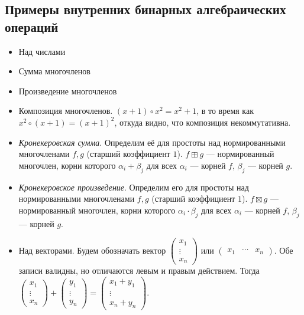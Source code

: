 \documentclass[a4paper]{report}
\begin{document}
    \subsection{Примеры внутренних бинарных алгебраических операций}
    \label{binary_operations}
    \begin{itemize}
        \item Над числами
        \item Сумма многочленов
        \item Произведение многочленов
        \item Композиция многочленов.
        $(x + 1) \circ x^2 = x^2 + 1$, в то время как $x^2 \circ (x + 1) = (x + 1)^2$, откуда видно, что композиция некоммутативна.
        \item \emph{Кронекеровская сумма}.
        Определим её для простоты над нормированными многочленами $f, g$ (старший коэффициент $1$).
        $f \boxplus  g$ --- нормированный многочлен, корни которого $\alpha_i + \beta_j$ для всех $\alpha_i$ --- корней $f$, $\beta_j$ --- корней $g$.

        \item \emph{Кронекеровское произведение}.
        Определим его для простоты над нормированными многочленами $f, g$ (старший коэффициент $1$).
        $f \boxtimes  g$ --- нормированный многочлен, корни которого $\alpha_i \cdot \beta_j$ для всех $\alpha_i$ --- корней $f$, $\beta_j$ --- корней $g$.

        \item Над векторами.
        Будем обозначать вектор $\begin{pmatrix}
                                     x_1\\ \vdots \\ x_n
        \end{pmatrix}$ или $\begin{pmatrix}
                                x_1& \cdots & x_n
        \end{pmatrix}$.
        Обе записи валидны, но отличаются левым и правым действием.
        Тогда $\begin{pmatrix}
                   x_1\\ \vdots \\ x_n
        \end{pmatrix} + \begin{pmatrix}
                            y_1\\ \vdots \\ y_n
        \end{pmatrix} = \begin{pmatrix}
                            x_1 + y_1\\ \vdots \\ x_n + y_n
        \end{pmatrix}$.


\end{itemize}
\end{document}
